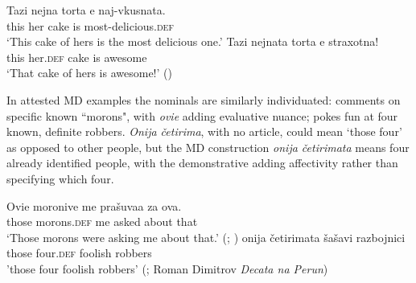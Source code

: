 \documentclass[output=paper,
colorlinks,
citecolor=brown,
newtxmath
]{langscibook}
\begin{document}
\ea
\ea \label{torta}
\gll Tazi nejna torta e 	naj-vkusnata.\\
this 	 her    cake is 	most-delicious.\textsc{def} \\
\glt‘This cake of hers is the most delicious one.’
\ex \label{tortata}
\gll Tazi nejnata torta e 	straxotna!\\
this   her.\textsc{def}  cake is 	awesome\\
\glt‘That cake of hers is awesome!’ \hfill()
\z\z

\noindent In attested MD examples the nominals are similarly individuated:  comments on specific known ``morons", with \textit{ovie} adding evaluative nuance;  pokes fun at four known, definite robbers. \textit{Onija četirima}, with no article, could mean `those four' as opposed to other people, but the MD construction \textit{onija četirimata} means four already identified people, with the demonstrative adding affectivity rather than specifying which four.

\ea \label{morons}
\gll Ovie 	moronive me	prašuvaa za	ova.\\
	those 	morons.\textsc{def}	me	asked	about 	that \\
\glt‘Those morons were asking me about that.’ \hfill(; \citealt{Prizma2015})
\z
\ea \label{four}
\gll onija 	četirimata šašavi razbojnici\\
those 	four.\textsc{def}	foolish robbers \\
\glt'those four foolish robbers' \hfill(; Roman Dimitrov \textit{Decata na Perun})
\z
\end{document}
